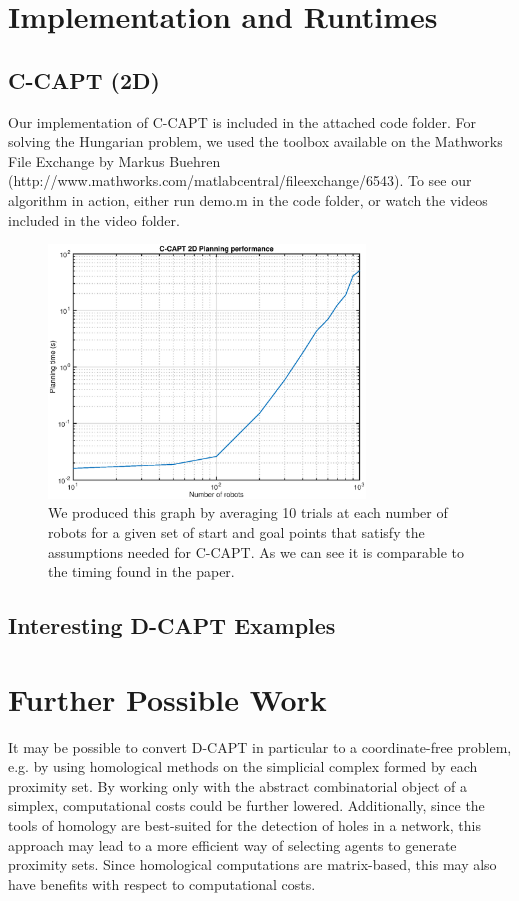\documentclass[11pt]{article}
\begin{document}
\section{Implementation and Runtimes}
\subsection{C-CAPT (2D)}
Our implementation of C-CAPT is included in the attached code folder. For solving the Hungarian problem, we used the toolbox available on the Mathworks File Exchange by Markus Buehren (http://www.mathworks.com/matlabcentral/fileexchange/6543). To see our algorithm in action, either run demo.m in the code folder, or watch the videos included in the video folder.
\begin{figure}[H]
\center
\includegraphics[width=0.75\textwidth]{images/timing_phase1.eps}\\
We produced this graph by averaging 10 trials at each number of robots for a given set of start and goal points that satisfy the assumptions needed for C-CAPT. As we can see it is comparable to the timing found in the paper.
\end{figure}

\subsection{Interesting D-CAPT Examples}



\section{Further Possible Work}
It may be possible to convert D-CAPT in particular to a coordinate-free problem, e.g. by using homological methods on the simplicial complex formed by each proximity set. By working only with the abstract combinatorial object of a simplex, computational costs could be further lowered. Additionally, since the tools of homology are best-suited for the detection of holes in a network, this approach may lead to a more efficient way of selecting agents to generate proximity sets. Since homological computations are matrix-based, this may also have benefits with respect to computational costs.
\end{document}
